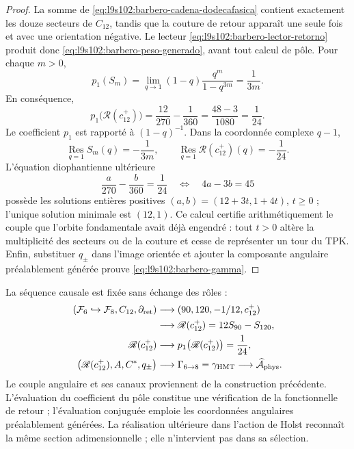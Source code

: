 \begin{proof}
La somme de \eqref{eq:l9s102:barbero-cadena-dodecafasica} contient exactement
les douze secteurs de \(C_{12}\), tandis que la couture de retour apparaît une
seule fois et avec une orientation négative. Le lecteur
\eqref{eq:l9s102:barbero-lector-retorno} produit donc
\eqref{eq:l9s102:barbero-peso-generado}, avant tout calcul de pôle. Pour
chaque \(m>0\),
\[
 p_1(S_m)
 =\lim_{q\to1}(1-q)\frac{q^m}{1-q^{3m}}
 =\frac1{3m}.
\]
En conséquence,
\[
 p_1\bigl(\mathscr R(c_{12}^{+})\bigr)
 =\frac{12}{270}-\frac1{360}
 =\frac{48-3}{1080}=\frac1{24}.
\]
Le coefficient \(p_1\) est rapporté à \((1-q)^{-1}\).
Dans la coordonnée complexe \(q-1\),
\[
 \operatorname*{Res}_{q=1}S_m(q)=-\frac1{3m},
 \qquad
 \operatorname*{Res}_{q=1}\mathscr R(c_{12}^{+})(q)=-\frac1{24}.
\]
L'équation diophantienne ultérieure
\[
 \frac a{270}-\frac b{360}=\frac1{24}
 \quad\Longleftrightarrow\quad 4a-3b=45
\]
possède les solutions entières positives
\((a,b)=(12+3t,1+4t)\), \(t\ge0\) ; l'unique solution minimale est
\((12,1)\). Ce calcul certifie arithmétiquement le couple que l'orbite
fondamentale avait déjà engendré : tout \(t>0\) altère la multiplicité des
secteurs ou de la couture et cesse de représenter un tour du TPK.
Enfin, substituer \(q_\pm\) dans l'image orientée et ajouter la composante
angulaire préalablement générée prouve \eqref{eq:l9s102:barbero-gamma}.
\end{proof}

La séquence causale est fixée sans échange des rôles :
\begin{equation}
\begin{aligned}
 (\mathcal F_6\hookrightarrow\mathcal F_8,C_{12},\partial_{\rm ret})
 &\longrightarrow (90,120,-1/12,c_{12}^{+})\\
 &\longrightarrow \mathscr R(c_{12}^{+})=12S_{90}-S_{120},\\
 \mathscr R(c_{12}^{+})
 &\longrightarrow p_1\bigl(\mathscr R(c_{12}^{+})\bigr)=\frac1{24},\\
 \bigl(\mathscr R(c_{12}^{+}),A,C^*,q_\pm\bigr)
 &\longrightarrow \Gamma_{6\to8}=\gamma_{\rm HMT}
 \longrightarrow \widehat{\mathcal A}_{\rm phys}.
\end{aligned}
 \label{eq:l9s102:barbero-cadena-completa}
\end{equation}
Le couple angulaire et ses canaux proviennent de la construction précédente.
L'évaluation du coefficient du pôle constitue une vérification
de la fonctionnelle de retour ; l'évaluation conjuguée emploie les
coordonnées angulaires préalablement générées.
La réalisation ultérieure dans l'action de Holst reconnaît la même section
adimensionnelle ; elle n'intervient pas dans sa sélection.

